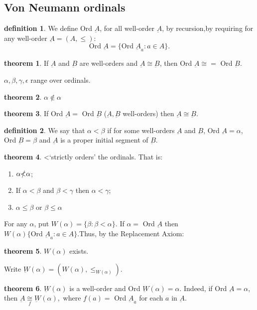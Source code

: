\documentclass[a4paper,11pt]{article}%
\theoremstyle{remark}
\theoremstyle{definition}
\newtheorem{theorem}{theorem}[section]
\theoremstyle{definition}
\newtheorem*{definition}{definition}
\theoremstyle{plain}
\theoremstyle{definition}
\begin{document}
\subsection{Von Neumann ordinals}
\begin{definition}
    We define Ord $\underbar{A}$, for all well-order $\underbar{A}$, by recursion,by 
    requiring for any well-order $\underbar{A}=(A,\leq)$:
    \[\text{Ord }\underbar{A}=\{\text{Ord }\underbar{A}_a:a\in A\}.\]
\end{definition}
\begin{theorem}
    If $\underbar{A}$ and $\underbar{B}$ are well-orders and $\underbar{A}\cong\underbar{B}$,
    then Ord $\underbar{A}\cong=$ Ord $\underbar{B}$.
\end{theorem}
$\alpha,\beta,\gamma,\epsilon$ range over ordinals.
\begin{theorem}
    $\alpha\notin\alpha$
\end{theorem}
\begin{theorem}
    If Ord $\underbar{A}=$ Ord $\underbar{B}$ ($\underbar{A},\underbar{B}$ well-orders) then $\underbar{A}\cong\underbar{B}$.
\end{theorem}
\begin{definition}
    We say that $\alpha<\beta$ if for some well-orders $\underbar{A}$ and $\underbar{B}$, Ord $\underbar{A}=\alpha$, Ord $\underbar{B}=\beta$
    and $\underbar{A}$ is a proper initial segment of $\underbar{B}$.
\end{definition}
\begin{theorem}
    <`strictly orders' the ordinals. That is:
    \begin{enumerate}
        \item $\alpha\slashed{<}\alpha$;
        \item If $\alpha<\beta$ and $\beta<\gamma$ then $\alpha<\gamma$;
        \item $\alpha\leq\beta$ or $\beta\leq\alpha$
    \end{enumerate}
\end{theorem}
For any $\alpha$, put $W(\alpha)=\{\beta:\beta<\alpha\}$. If $\alpha=$ Ord $\underbar{A}$ 
then $W(\alpha)\{\text{Ord }\underbar{A}_a:a\in A\}.$Thus, by the Replacement Axiom:
\begin{theorem}
    $W(\alpha)$ exists.
\end{theorem}
Write $\underbar{W}(\alpha)=(W(\alpha),\leq_{W(\alpha)})$.
\begin{theorem}
    $\underbar{W}(\alpha)$ is a well-order and Ord $\underbar{W}(\alpha)=\alpha$.
    Indeed, if Ord $\underbar{A}=\alpha$, then $\underbar{A}\underset{f}{\cong}\underbar{W}(\alpha),$
    where $f(a)=$ Ord $\underbar{A}_a$ for each $a$ in $\underbar{A}$.
\end{theorem}
\end{document}
